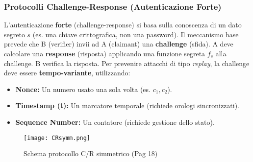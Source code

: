 \documentclass[../main.tex]{subfiles}
\begin{document}
\subsubsection{Protocolli Challenge-Response (Autenticazione Forte)}
L'autenticazione \textbf{forte} (challenge-response) si basa sulla conoscenza di un dato segreto $s$ (es. una chiave crittografica, non una password).
Il meccanismo base prevede che B (verifier) invii ad A (claimant) una \textbf{challenge} (sfida). A deve calcolare una \textbf{response} (risposta) applicando una funzione segreta $f_s$ alla challenge. B verifica la risposta.
Per prevenire attacchi di tipo \emph{replay}, la challenge deve essere \textbf{tempo-variante}, utilizzando:
\begin{itemize}
    \item \textbf{Nonce:} Un numero usato una sola volta (es. $c_1, c_2$).
    \item \textbf{Timestamp (t):} Un marcatore temporale (richiede orologi sincronizzati).
    \item \textbf{Sequence Number:} Un contatore (richiede gestione dello stato).
\end{itemize}

\begin{figure}[H]
  \centering
  \texttt{[image: CRsymm.png]}
  \caption{Schema protocollo C/R simmetrico (Pag 18)}
  \label{fig:CRsymm}
\end{figure}
\end{document}
